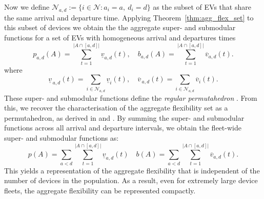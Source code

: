 Now we define $ \mathcal{N}_{a,d} := \{i\in\mathcal{N} : a_i = a,\ d_i = d\}$ as the subset of EVs that share the same arrival and departure time. 
Applying Theorem~\ref{thm:agg_flex_set} to this subset of devices we obtain the the aggregate super- and submodular functions for a set of EVs with homogeneous arrival and departures times
\begin{equation}\label{eq:ev_v_rep}
  p_{a,d}(A) = \sum_{t=1}^{\lvert A\cap [a,d]|} \underline v_{a,d}(t),
  \quad
  b_{a,d}(A) = \sum_{t=1}^{\lvert A\cap [a,d]|} \overline v_{a,d}(t).
\end{equation}
where
\[
  \underline v_{\,a,d}(t) = \sum_{i\in\mathcal{N}_{a,d}} \underline v_i(t),
  \quad
  \overline v_{\,a,d}(t)=\sum_{i\in\mathcal{N}_{a,d}} \overline v_i(t).
\]
These super- and submodular functions define the \textit{regular permutahedron} \cite{Postnikov2009PermutohedraBeyond}. From this, we recover the characterisation of the aggregate flexibility set as a permutahedron, as derived in \cite{Mukhi2023AnVehicles} and \cite{Panda2024EfficientVehicles}. By summing the super- and submodular functions across all arrival and departure intervals, we obtain the fleet-wide super- and submodular functions as:
\begin{equation*}\label{eq:V1G_aggregate_permutahedra}
    p(A) = \sum_{a < d}\sum_{t=1}^{\lvert A\cap [a,d]|} \underline v_{a,d}(t)
    \quad
    b(A) = \sum_{a < d}\sum_{t=1}^{\lvert A\cap [a,d]|} \overline v_{a,d}(t).
\end{equation*}
This yields a representation of the  aggregate flexibility that is independent of the number of devices in the population. As a result, even for extremely large device fleets, the aggregate flexibility can be represented compactly.

